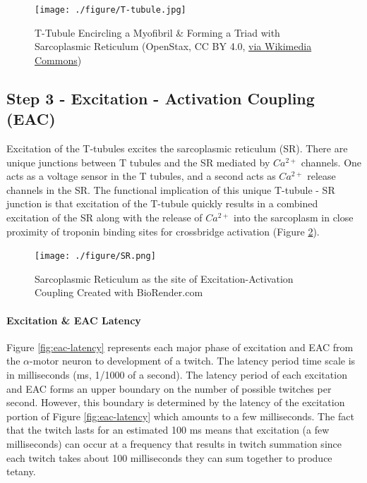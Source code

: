 
\begin{figure}[!ht]
    \centering
    \texttt{[image: ./figure/T-tubule.jpg]}
    \caption{T-Tubule Encircling a Myofibril \& Forming a Triad with Sarcoplasmic Reticulum  \footnotesize{(OpenStax, CC BY 4.0, \href{https://creativecommons.org/licenses/by/4.0}{via Wikimedia Commons})}}
    \label{fig:T-tubule}
\end{figure}

\subsection{Step 3 - Excitation - Activation Coupling (EAC)}
Excitation of the T-tubules excites the sarcoplasmic reticulum (SR). There are unique junctions between T tubules and the SR mediated by $Ca^{2+}$ channels. One acts as a voltage sensor in the T tubules, and a second acts as $Ca^{2+}$ release channels in the SR.\footnotemark{} The functional implication of this unique T-tubule - SR junction is that excitation of the T-tubule quickly results in a combined excitation of the SR along with the release of $Ca^{2+}$ into the sarcoplasm\footnotemark{} in close proximity of troponin binding sites for crossbridge activation (Figure \ref{fig:SR}).

\begin{figure}[!ht]
    \centering
    \texttt{[image: ./figure/SR.png]}
    \caption{Sarcoplasmic Reticulum as the site of Excitation-Activation Coupling \footnotesize{Created with BioRender.com}}
    \label{fig:SR}
\end{figure}

\paragraph{Excitation \& EAC Latency}

Figure \ref{fig:eac-latency} represents each major phase of excitation and EAC from the $\alpha$-motor neuron to development of a twitch. The latency period time scale is in milliseconds (ms, 1/1000 of a second). The latency period of each excitation and EAC forms an upper boundary on the number of possible twitches per second. However, this boundary is determined by the latency of the excitation portion of Figure \ref{fig:eac-latency} which amounts to a few milliseconds. The fact that the twitch lasts for an estimated 100 ms means that excitation (a few milliseconds) can occur at a frequency that results in twitch summation since each twitch takes about 100 milliseconds they can sum together to produce tetany.

